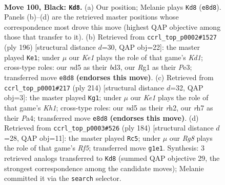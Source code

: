\documentclass[11pt]{article}
\begin{document}
\clearpage

\begin{figure}[p]\centering
\begin{subfigure}{0.46\textwidth}\centering
\resizebox{\linewidth}{!}{%
\newchessgame
\chessboard[
  setfen={4k3/7R/PP1B4/3N4/4B1b1/1K5p/8/6r1 b - - 0 100},
  showmover=false,
  pgfstyle=straightmove, color=movearrow, markmove={e8-d8}
]}
\caption{}
\end{subfigure}\hfill
\begin{subfigure}{0.46\textwidth}\centering
\resizebox{\linewidth}{!}{%
\newchessgame
\chessboard[
  setfen={8/8/3k1P2/6R1/3Bp3/3bP3/5r2/3K4 w - - 7 99},
  showmover=false,
  pgfstyle=straightmove, color=movearrow, markmove={d1-e1}
]}
\caption{}
\end{subfigure}
\\[4pt]
\begin{subfigure}{0.46\textwidth}\centering
\resizebox{\linewidth}{!}{%
\newchessgame
\chessboard[
  setfen={8/8/1R5p/1B5P/P2k1b2/8/7r/7K w - - 1 108},
  showmover=false,
  pgfstyle=straightmove, color=movearrow, markmove={h1-g1}
]}
\caption{}
\end{subfigure}\hfill
\begin{subfigure}{0.46\textwidth}\centering
\resizebox{\linewidth}{!}{%
\newchessgame
\chessboard[
  setfen={8/4k2p/8/1B3R2/P7/r7/6K1/2b5 w - - 3 93},
  showmover=false,
  pgfstyle=straightmove, color=movearrow, markmove={f5-c5}
]}
\caption{}
\end{subfigure}
\caption{\textbf{Move 100, Black: \texttt{Kd8}.} (a) Our position; Melanie plays \texttt{Kd8} (\texttt{e8d8}). Panels (b)--(d) are the retrieved master positions whose correspondence most drove this move (highest QAP objective among those that transfer to it). (b) Retrieved from \texttt{ccrl\_top\_p0002\#1527} (ply 196) [structural distance $d$=30, QAP obj=22]: the master played \texttt{Ke1}; under $\mu$ our \emph{Ke1} plays the role of that game's \emph{Kd1}; cross-type roles: our \emph{n}d5 as their \emph{b}d3, our \emph{R}g1 as their \emph{P}e3; transferred move \texttt{e8d8} \textbf{(endorses this move)}. (c) Retrieved from \texttt{ccrl\_top\_p0001\#217} (ply 214) [structural distance $d$=32, QAP obj=3]: the master played \texttt{Kg1}; under $\mu$ our \emph{Ke1} plays the role of that game's \emph{Kh1}; cross-type roles: our \emph{n}d5 as their \emph{r}h2, our \emph{r}h7 as their \emph{P}a4; transferred move \texttt{e8d8} \textbf{(endorses this move)}. (d) Retrieved from \texttt{ccrl\_top\_p0003\#526} (ply 184) [structural distance $d$=28, QAP obj=11]: the master played \texttt{Rc5}; under $\mu$ our \emph{Rg8} plays the role of that game's \emph{Rf5}; transferred move \texttt{g1e1}. Synthesis: 3 retrieved analogs transferred to \texttt{Kd8} (summed QAP objective 29, the strongest correspondence among the candidate moves); Melanie committed it via the \texttt{search} selector.}
\label{fig:thought-m199}
\end{figure}
\end{document}
